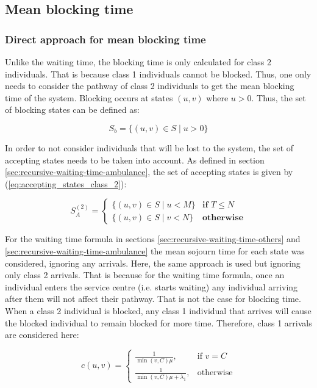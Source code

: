 \subsection{Mean blocking time}

\subsubsection{Direct approach for mean blocking time}

Unlike the waiting time, the blocking time is only calculated for class 2 individuals.  
That is because class 1 individuals cannot be blocked. 
Thus, one only needs to consider the pathway of class 2 individuals to get the 
mean blocking time of the system. 
Blocking occurs at states \((u,v)\) where \(u > 0 \). 
Thus, the set of blocking states can be defined as:

\begin{equation*}
    S_b = \{(u,v) \in S \; | \; u > 0\}
\end{equation*}
 
In order to not consider individuals that will be lost to the system, the set of 
accepting states needs to be taken into account. As defined in section 
\ref{sec:recursive-waiting-time-ambulance},
the set of accepting states is given by (\ref{eq:accepting_states_class_2}):

\begin{equation*}
    S_A^{(2)}=
    \begin{cases}
        \{(u, v) \in S \; | \; u < M \} & \textbf{if } T \leq N\\
        \{(u, v) \in S \; | \; v < N \} & \textbf{otherwise}
    \end{cases}
\end{equation*}

For the waiting time formula in sections \ref{sec:recursive-waiting-time-others}
and \ref{sec:recursive-waiting-time-ambulance}
the mean sojourn time for each state was considered,
ignoring any arrivals. Here, the same approach is used but ignoring only class 2
arrivals. That is because for the waiting time formula, once an individual enters 
the service centre (i.e. starts waiting) any individual arriving after them will 
not affect their
pathway. That is not the case for blocking time. When a class 2 individual is 
blocked, 
any class 1 individual that arrives will cause the blocked individual to remain 
blocked for more time. Therefore, class 1 arrivals are considered here:

\begin{equation}\label{eq:time_in_state_blocking_time}
    c(u,v) = 
    \begin{cases}
        \frac{1}{\min(v,C) \mu}, & \text{if } v = C\\
        \frac{1}{\min(v,C) \mu + \lambda_1}, & \text{otherwise}
    \end{cases}
\end{equation}
 
